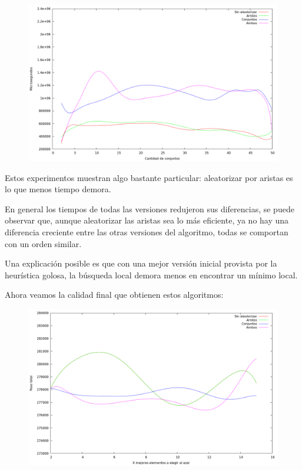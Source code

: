 \vspace*{0.5cm}

\vspace*{0.5cm}

\begin{figure}[h]
  \begin{center}
    \includegraphics[scale=0.35]{imagenes/grasp-local-k-tiempo.png}
  \end{center}
\end{figure}

\vspace*{0.5cm}

Estos experimentos muestran algo bastante particular: aleatorizar por aristas
es lo que menos tiempo demora.

En general los tiempos de todas las versiones redujeron sus diferencias, se
puede observar que, aunque aleatorizar las aristas sea lo más eficiente, ya no
hay una diferencia creciente entre las otras versiones del algoritmo, todas
se comportan con un orden similar.

Una explicación posible es que con una mejor versión inicial provista por
la heurística golosa, la búsqueda local demora menos en encontrar un mínimo
local.

Ahora veamos la calidad final que obtienen estos algoritmos:

\vspace*{0.5cm}

\begin{figure}[h]
  \begin{center}
    \includegraphics[scale=0.35]{imagenes/grasp-local-x-peso.png}
  \end{center}
\end{figure}

